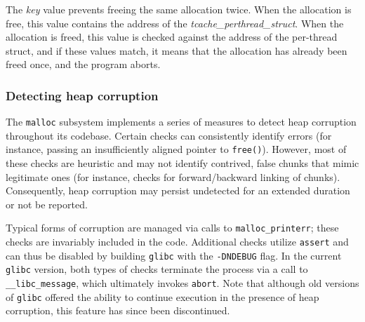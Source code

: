 \documentclass{article}
\begin{document}
The \emph{key} value prevents freeing the same allocation twice. When the allocation is free, this value contains the address of the \emph{tcache\_perthread\_struct}. When the allocation is freed, this value is checked against the address of the per-thread struct, and if these values match, it means that the allocation has already been freed once, and the program aborts.

\subsubsection{Detecting heap corruption}
The \texttt{malloc} subsystem implements a series of measures to detect heap corruption throughout its codebase. Certain checks can consistently identify errors (for instance, passing an insufficiently aligned pointer to \texttt{free()}). However, most of these checks are heuristic and may not identify contrived, false chunks that mimic legitimate ones (for instance, checks for forward/backward linking of chunks). Consequently, heap corruption may persist undetected for an extended duration or not be reported.

Typical forms of corruption are managed via calls to \texttt{malloc\_printerr}; these checks are invariably included in the code. Additional checks utilize \texttt{assert} and can thus be disabled by building \texttt{glibc} with the \texttt{-DNDEBUG} flag. In the current \texttt{glibc} version, both types of checks terminate the process via a call to \texttt{\_\_libc\_message}, which ultimately invokes \texttt{abort}. Note that although old versions of \texttt{glibc} offered the ability to continue execution in the presence of heap corruption, this feature has since been discontinued.

\end{document}
